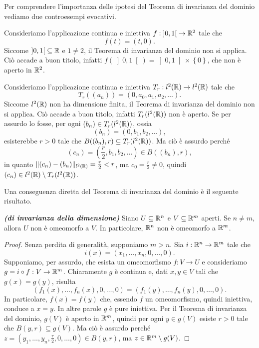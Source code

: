 Per comprendere l'importanza delle ipotesi del Teorema di invarianza del dominio vediamo due controesempi evocativi.
\begin{esempio}
	Consideriamo l'applicazione continua e iniettiva $f: \left] 0,1\right[ \to \mathbb{R}^2$ tale che
	\[ f(t) = (t,0). \]
	Siccome $ \left] 0,1\right[ \subseteq \mathbb{R}$ e $1 \ne 2$, il Teorema di invarianza del dominio non si applica. Ciò accade a buon titolo, infatti $f( \left] 0,1\right[) =  \left] 0,1\right[ \times \left\lbrace 0\right\rbrace$, che non è aperto in $\mathbb{R}^2$.
\end{esempio}

\begin{esempio}
	Consideriamo l'applicazione continua e iniettiva $T_r: l^2(\mathbb{R}) \to l^2(\mathbb{R}) $ tale che
	\[ T_r((a_n)) = (0,a_0,a_1,a_2,\dots). \]
	Siccome $ l^2(\mathbb{R}) $ non ha dimensione finita, il Teorema di invarianza del dominio non si applica. Ciò accade a buon titolo, infatti $T_r(l^2(\mathbb{R}))$ non è aperto. Se per assurdo lo fosse, per ogni $(b_n) \in T_r(l^2(\mathbb{R}))$, ossia
	\[ (b_n) = (0,b_1,b_2,\dots), \]
	esisterebbe $r >0$ tale che $B((b_n),r) \subseteq T_r(l^2(\mathbb{R}))$. Ma ciò è assurdo perché 
	\[ (c_n) = \left( \frac{r}{2},b_1,b_2,\dots\right)  \in B((b_n),r),\]
	in quanto $\lVert(c_n)-(b_n)\rVert_{l^2(\mathbb{R})} = \frac{r}{2}<r$, ma $c_0 = \frac{r}{2} \ne 0$, quindi $(c_n) \in l^2(\mathbb{R}) \setminus T_r(l^2(\mathbb{R}))$.
\end{esempio}
Una conseguenza diretta del Teorema di invarianza del dominio è il seguente risultato.
\begin{teorema}\textbf{\emph{(di invarianza della dimensione)}}
	Siano $U \subseteq \mathbb{R}^n$ e $V \subseteq \mathbb{R}^m$ aperti. Se $n \ne m$, allora $U$ non è omeomorfo a $V$. In particolare, $\mathbb{R}^n$ non è omeomorfo a $\mathbb{R}^m$.
\end{teorema}
\begin{proof}
	Senza perdita di generalità, supponiamo $m > n$. Sia $i: \mathbb{R}^n \to \mathbb{R}^m$ tale che
	\[ i(x) = (x_1,\dots,x_n,0,\dots,0). \]
	Supponiamo, per assurdo, che esista un omeomorfismo $f: V \to U$ e consideriamo $g = i \circ f: V \to \mathbb{R}^m$. Chiaramente $g$ è continua e, dati $x,y \in V $ tali che $g(x) = g(y)$, risulta
	\[ (f_1(x),\dots,f_n(x),0,\dots,0) = (f_1(y),\dots,f_n(y),0,\dots,0). \]
	In particolare, $f(x) = f(y)$ che, essendo $f$ un omeomorfismo, quindi iniettiva, conduce a $x=y$. In altre parole $g$ è pure iniettiva. Per il Teorema di invarianza del dominio, $g(V)$ è aperto in $\mathbb{R}^m$, quindi per ogni $y \in g(V)$ esiste $r>0$ tale che $B(y,r) \subseteq g(V)$. Ma ciò è assurdo perché $z = \left( y_1,\dots,y_n,\frac{r}{2},0,\dots,0\right)  \in B(y,r)$, ma $z \in \mathbb{R}^m \setminus g(V)$.
\end{proof}

